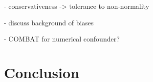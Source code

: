 \documentclass{article}
\begin{document}
- conservativeness -> tolerance to non-normality

- discuss background of biases

- COMBAT for numerical confounder?

\section{Conclusion}


  


\newpage

\end{document}
